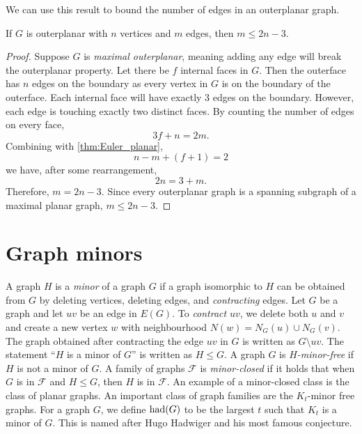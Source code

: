 We can use this result to bound the number of edges in an outerplanar graph.
\begin{theorem}\label{thm:outerplanar_bound}
	If \(G\) is outerplanar with \(n\) vertices and \(m\) edges, then \(m \leq 2n - 3\).
\end{theorem}

\begin{proof}
	Suppose \(G\) is \textit{maximal outerplanar}, meaning adding any edge will break the outerplanar property. Let there be \(f\) internal faces in $G$. Then the outerface has \(n\) edges on the boundary as every vertex in $G$ is on the boundary of the outerface. Each internal face will have exactly \(3\) edges on the boundary. However, each edge is touching exactly two distinct faces. By counting the number of edges on every face,
	\begin{equation*}
		3 f + n = 2m.
	\end{equation*}
	Combining with \cref{thm:Euler_planar},
	\begin{equation*}
		n - m + (f + 1) = 2
	\end{equation*}
	we have, after some rearrangement,
	\begin{equation*}
		2n = 3 + m.
	\end{equation*}
	Therefore, \(m = 2n - 3\). Since every outerplanar graph is a spanning subgraph of a maximal planar graph, \(m \leq 2n - 3\).
\end{proof}
\section{Graph minors}\label{sec:Graph Minors}
A graph \(H\) is a \textit{minor} of a graph \(G\) if a graph isomorphic to \(H\) can be obtained from \(G\) by deleting vertices, deleting edges, and \textit{contracting} edges. Let $G$ be a graph and let $uv$ be an edge in $E(G)$. To \textit{contract} \(uv\), we delete both \(u\) and \(v\) and create a new vertex \(w\) with neighbourhood \(N(w) = N_G(u) \cup N_G(v)\). The graph obtained after contracting the edge \(uv\) in $G$ is written as \(G\setminus uv\).
The statement ``\(H\) is a minor of \(G\)'' is written as \(H \leq G\). A graph \(G\) is \textit{\(H\)-minor-free} if $H$ is not a minor of $G$. A family of graphs \(\mathcal{F}\) is \textit{minor-closed} if it holds that when $G$ is in \(\mathcal{F}\) and \(H \leq G\), then $H$ is in \(\mathcal{F}\).
An example of a minor-closed class is the class of planar graphs.
An important class of graph families are the \(K_t\)-minor free graphs. For a graph \(G\), we define \(\operatorname{had}(G)\) to be the largest \(t\) such that \(K_t\) is a minor of \(G\). This is named after Hugo Hadwiger and his most famous conjecture.

